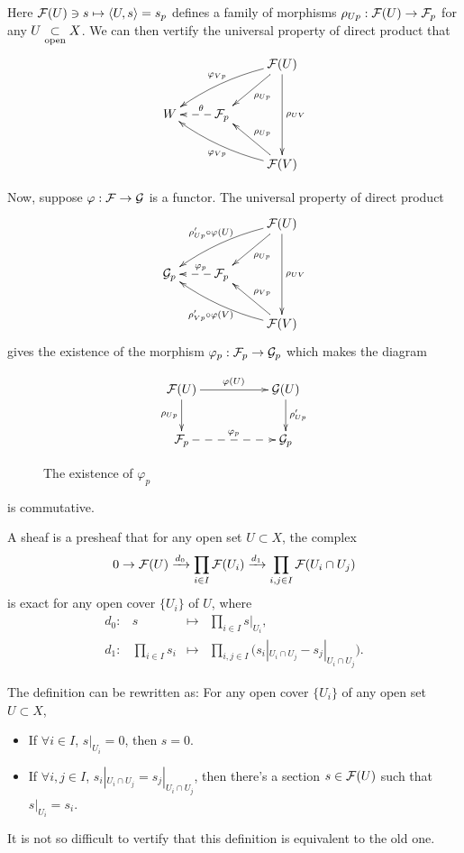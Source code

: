 \documentclass[12pt]{extbook}
\begin{document}
Here $\mathcal{F}(U)\ni s\mapsto \langle U,s\rangle=s_p$ defines a family of morphisms $\rho_{Up}:\mathcal{F}(U)\to \mathcal{F}_p$ for any $U\underset{\mathrm{open}}{\subset} X$. We can then vertify the universal property of direct product that
\[
	\xymatrix{
	&&\ar[dl]^{\rho_{Up}}\calf(U)\ar[dd]^{\rho_{UV}}\ar@/_/[lld]_{\varphi_{Vp}} \\
	W&\ar@{-->}[l]_(0.4){\theta}\calf_p&\\
	&&\ar[ul]_{\rho_{Up}}\calf(V)\ar@/^/[llu]^{\varphi_{Vp}}
	}
\]

Now, suppose $\varphi:\mathcal{F} \to \mathcal{G}$ is a functor. The universal property of direct product 
\[
	\xymatrix{
		&&\ar[dl]^{\rho_{Up}}\calf(U)\ar[dd]^{\rho_{UV}}\ar@/_/[lld]_{\rho'_{Up}\circ\varphi(U)} \\
		\calg_p&\ar@{-->}[l]_(0.4){\varphi_p}\calf_p&\\
		&&\ar[ul]_{\rho_{Vp}}\calf(V)\ar@/^/[llu]^{\rho'_{Vp}\circ\varphi(V)}
	}
\]
gives the existence of the morphism $\varphi_p:\mathcal{F}_p\to \mathcal{G}_p$ which makes the diagram
\begin{figure}[h]
\[
	\xymatrix{
		\calf(U)\ar[rr]^{\varphi(U)} \ar[d]_{\rho_{Up}}&&\calg(U) \ar[d]^{\rho'_{Up}}\\
		\calf_p\ar@{-->}[rr]^{\varphi_p}&&\calg_p
	}
\]
\caption{The existence of $\varphi_p$}
\label{fig1}
\end{figure}

\noindent is commutative.

\para A sheaf is a presheaf that for any open set $U\subset X$, the complex 
\[
	0\rightarrow \mathcal{F}(U) \xrightarrow{d_0}\prod_{i\in I}\mathcal{F}(U_i) \xrightarrow{d_1}\prod_{i,j\in I}\mathcal{F}(U_i\cap U_j)
\]
is exact for any open cover $\{U_i\}$ of $U$, where
\[
\begin{array}{cccl}
	d_0:&s&\mapsto& \displaystyle{\prod_{i\in I}s|_{U_i}},\\
	d_1:&\displaystyle{\prod_{i\in I}s_i}&\mapsto& \displaystyle{\prod_{i,j\in I}\bigl(s_i|_{U_i\cap U_j}-s_j|_{U_i\cap U_j}\bigr)}.
\end{array}
\]

The definition can be rewritten as: For any open cover $\{U_i\}$ of any open set $U\subset X$,
\begin{itemize}
\item If $\forall i\in I$, $s|_{U_i}=0$, then $s=0$.

\item If $\forall i,j\in I$, $s_i|_{U_i\cap U_j}=s_j|_{U_i\cap U_j}$, then there's a section $s\in\mathcal{F}(U)$ such that $s|_{U_i}=s_i$.
\end{itemize}
It is not so difficult to vertify that this definition is equivalent to the old one.
\end{document}
